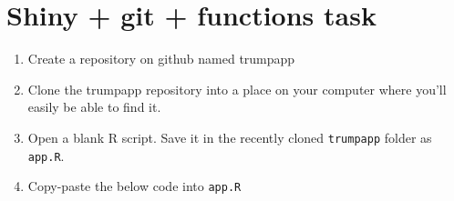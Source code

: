 \documentclass[
]{book}
\begin{document}
\hypertarget{shiny-git-functions-task}{%
\chapter{Shiny + git + functions task}\label{shiny-git-functions-task}}

\begin{enumerate}
\def\labelenumi{\arabic{enumi}.}
\item
  Create a repository on github named trumpapp
\item
  Clone the trumpapp repository into a place on your computer where you'll easily be able to find it.
\item
  Open a blank R script. Save it in the recently cloned \texttt{trumpapp} folder as \texttt{app.R}.
\item
  Copy-paste the below code into \texttt{app.R}
\end{enumerate}
\end{document}
